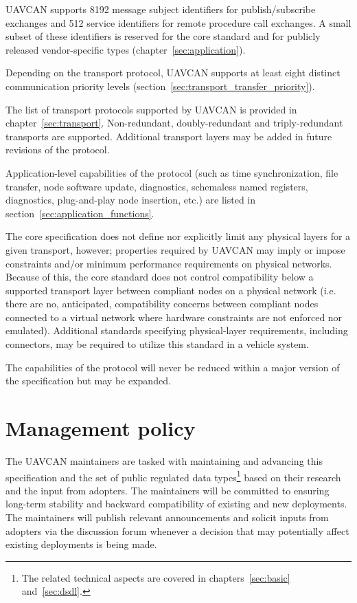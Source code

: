 UAVCAN supports 8192 message subject identifiers for publish/subscribe exchanges and
512 service identifiers for remote procedure call exchanges.
A small subset of these identifiers is reserved for the core standard and for publicly released vendor-specific types
(chapter~\ref{sec:application}).

Depending on the transport protocol, UAVCAN supports at least eight distinct communication priority levels
(section~\ref{sec:transport_transfer_priority}).

The list of transport protocols supported by UAVCAN is provided in chapter~\ref{sec:transport}.
Non-redundant, doubly-redundant and triply-redundant transports are supported.
Additional transport layers may be added in future revisions of the protocol.

Application-level capabilities of the protocol (such as time synchronization, file transfer,
node software update, diagnostics, schemaless named registers, diagnostics, plug-and-play node insertion, etc.)
are listed in section~\ref{sec:application_functions}.

The core specification does not define nor explicitly limit any physical layers for a given transport, however;
properties required by UAVCAN may imply or impose constraints and/or minimum performance requirements on physical
networks. Because of this, the core standard does not control compatibility below a supported transport layer between
compliant nodes on a physical network (i.e. there are no, anticipated, compatibility concerns between compliant nodes
connected to a virtual network where hardware constraints are not enforced nor emulated).
Additional standards specifying physical-layer requirements, including connectors,
may be required to utilize this standard in a vehicle system.

The capabilities of the protocol will never be reduced within a major version of the specification but may be expanded.

\section{Management policy}

The UAVCAN maintainers are tasked with maintaining and advancing this specification and
the set of public regulated data types\footnote{%
    The related technical aspects are covered in chapters~\ref{sec:basic} and~\ref{sec:dsdl}.
} based on their research and the input from adopters.
The maintainers will be committed to ensuring long-term stability and backward compatibility of
existing and new deployments.
The maintainers will publish relevant announcements and solicit inputs from adopters
via the discussion forum whenever a decision that may potentially affect existing deployments is being made.

